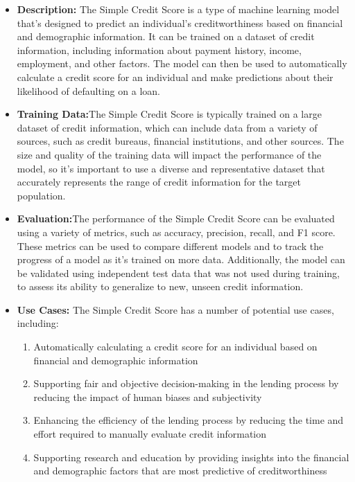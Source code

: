 \begin{itemize}
\begin{itemize}
    \item \textbf{Description:} The Simple Credit Score is a type of machine learning model that's designed to predict an individual's creditworthiness based on financial and demographic information. It can be trained on a dataset of credit information, including information about payment history, income, employment, and other factors. The model can then be used to automatically calculate a credit score for an individual and make predictions about their likelihood of defaulting on a loan.
    \item \textbf{Training Data:}The Simple Credit Score is typically trained on a large dataset of credit information, which can include data from a variety of sources, such as credit bureaus, financial institutions, and other sources. The size and quality of the training data will impact the performance of the model, so it's important to use a diverse and representative dataset that accurately represents the range of credit information for the target population.
    \item \textbf{Evaluation:}The performance of the Simple Credit Score can be evaluated using a variety of metrics, such as accuracy, precision, recall, and F1 score. These metrics can be used to compare different models and to track the progress of a model as it's trained on more data. Additionally, the model can be validated using independent test data that was not used during training, to assess its ability to generalize to new, unseen credit information.
    \item \textbf{Use Cases:} The Simple Credit Score has a number of potential use cases, including:
        \begin{enumerate}  
            \item Automatically calculating a credit score for an individual based on financial and demographic information
            \item Supporting fair and objective decision-making in the lending process by reducing the impact of human biases and subjectivity
            \item Enhancing the efficiency of the lending process by reducing the time and effort required to manually evaluate credit information
            \item Supporting research and education by providing insights into the financial and demographic factors that are most predictive of creditworthiness
        \end{enumerate}

\end{itemize}
\end{itemize}
